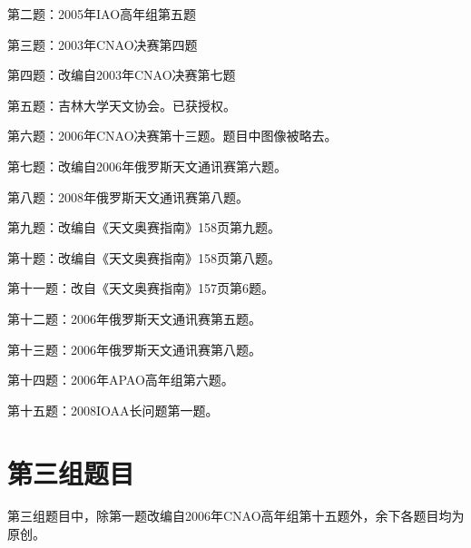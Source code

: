 \documentclass[a4paper,12pt]{report}
\begin{document}
第二题：2005年IAO高年组第五题

第三题：2003年CNAO决赛第四题

第四题：改编自2003年CNAO决赛第七题

第五题：吉林大学天文协会。已获授权。

第六题：2006年CNAO决赛第十三题。题目中图像被略去。

第七题：改编自2006年俄罗斯天文通讯赛第六题。

第八题：2008年俄罗斯天文通讯赛第八题。

第九题：改编自《天文奥赛指南》158页第九题。

第十题：改编自《天文奥赛指南》158页第八题。

第十一题：改自《天文奥赛指南》157页第6题。

第十二题：2006年俄罗斯天文通讯赛第五题。

第十三题：2006年俄罗斯天文通讯赛第八题。

第十四题：2006年APAO高年组第六题。

第十五题：2008IOAA长问题第一题。

\section{第三组题目}
第三组题目中，除第一题改编自2006年CNAO高年组第十五题外，余下各题目均为原创。
\end{document}
